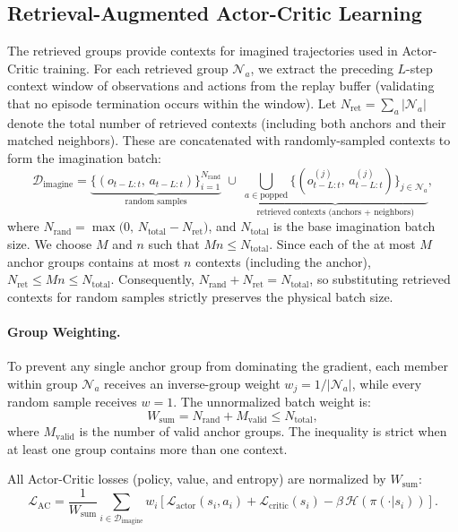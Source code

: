 \documentclass{article} %
\begin{document}
\subsection{Retrieval-Augmented Actor-Critic Learning}
\label{subsec:flash_learning}
The retrieved groups provide contexts for imagined trajectories used in Actor-Critic training.
For each retrieved group $\mathcal{N}_a$, we extract the preceding $L$-step context window of observations and actions from the replay buffer (validating that no episode termination occurs within the window). Let $N_{\text{ret}} = \sum_{a} |\mathcal{N}_a|$ denote the total number of retrieved contexts (including both anchors and their matched neighbors). These are concatenated with randomly-sampled contexts to form the imagination batch:
\begin{equation}
\mathcal{D}_{\text{imagine}} = \underbrace{\{(o_{t-L:t},\, a_{t-L:t})\}_{i=1}^{N_\text{rand}}}_{\text{random samples}} \;\cup\; \underbrace{\bigcup_{a \in \text{popped}} \{(o^{(j)}_{t-L:t},\, a^{(j)}_{t-L:t})\}_{j \in \mathcal{N}_a}}_{\text{retrieved contexts (anchors + neighbors)}},
\label{eq:batch_compose}
\end{equation}
where $N_{\text{rand}} = \max\big(0,\, N_{\text{total}} - N_{\text{ret}}\big)$, and $N_{\text{total}}$ is the base imagination batch size. We choose $M$ and $n$ such that $Mn \leq N_{\text{total}}$. Since each of the at most $M$ anchor groups contains at most $n$ contexts (including the anchor), $N_{\text{ret}} \leq Mn \leq N_{\text{total}}$. Consequently, $N_{\text{rand}} + N_{\text{ret}} = N_{\text{total}}$, so substituting retrieved contexts for random samples strictly preserves the physical batch size.

\paragraph{Group Weighting.}
To prevent any single anchor group from dominating the gradient, each member within group $\mathcal{N}_a$ receives an inverse-group weight $w_j = 1/|\mathcal{N}_a|$, while every random sample receives $w=1$. The unnormalized batch weight is:
\begin{equation}
W_{\text{sum}} = N_{\text{rand}} + M_{\text{valid}} \leq N_{\text{total}},
\label{eq:weight_sum}
\end{equation}
where $M_{\text{valid}}$ is the number of valid anchor groups. The inequality is strict when at least one group contains more than one context.

All Actor-Critic losses (policy, value, and entropy) are normalized by $W_{\text{sum}}$:
\begin{equation}
\mathcal{L}_{\text{AC}} = \frac{1}{W_{\text{sum}}} \sum_{i \in \mathcal{D}_{\text{imagine}}} w_i \left[\mathcal{L}_{\text{actor}}(s_i, a_i) + \mathcal{L}_{\text{critic}}(s_i) - \beta \, \mathcal{H}(\pi(\cdot | s_i))\right].
\label{eq:weighted_loss}
\end{equation}
\end{document}
